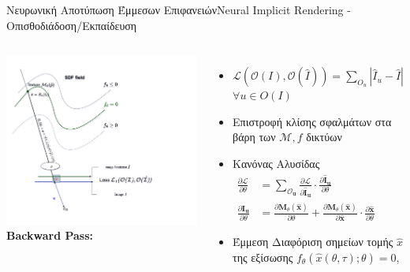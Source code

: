 \documentclass[10pt]{beamer}
\begin{document}
\begin{frame}[t]{Nευρωνική Αποτύπωση Έμμεσων Επιφανειών}{Neural Implicit Rendering - Oπισθοδιάδοση/Εκπαίδευση}
    \begin{columns}[T]
    \centering
    \includegraphics[height=.6\textheight]{images/NeuralRendering-Page-3.jpg}     
        \textbf{Backward Pass:}
         \begin{itemize}
             \item\(\mathcal{L}(\mathcal{O}(I),\mathcal{O}(\hat{I}))=\sum_{O_u}{|\hat{I}_u - \hat{I}|}\) \(\forall u \in {O(I)} \)
            \item Επιστροφή κλίσης σφαλμάτων στα βάρη των \(\mathcal{M},f\) δικτύων       \item Κανόνας Αλυσίδας
            \(\begin{aligned}
            \frac{\partial \mathcal{L}}{\partial \theta} & =\sum_{\mathcal{O}_\mathbf{u}} \frac{\partial \mathcal{L}}{\partial \hat{\mathbf{I}}_{\mathbf{u}}} \cdot \frac{\partial \hat{\mathbf{I}}_{\mathbf{u}}}{\partial \theta} \\
            \frac{\partial \hat{\mathbf{I}}_{\mathbf{u}}}{\partial \theta} & =\frac{\partial \mathbf{M}_\theta(\hat{\mathbf{x}})}{\partial \theta}+\frac{\partial \mathbf{M}_\theta(\hat{\mathbf{x}})}{\partial \hat{\mathbf{x}}} \cdot \frac{\partial \hat{\mathbf{x}}}{\partial \theta}
            \end{aligned}\)
            \item Έμμεση Διαφόριση σημείων τομής \(\hat{x}\) της εξίσωσης $f_\theta(\hat{x}(\theta,\tau);\theta)=0$, \fontsize{7}{7}
         \end{itemize}      
    \end{columns}
\end{frame}
\end{document}
